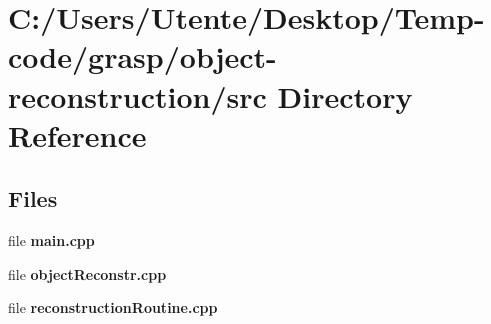 \section{C\+:/\+Users/\+Utente/\+Desktop/\+Temp-\/code/grasp/object-\/reconstruction/src Directory Reference}
\label{dir_d66a79fe53ea9cc766b7a9ad445c352f}
\subsection*{Files}
\begin{DoxyCompactItemize}
\item 
file {\bfseries main.\+cpp}
\item 
file {\bfseries object\+Reconstr.\+cpp}
\item 
file {\bfseries reconstruction\+Routine.\+cpp}
\end{DoxyCompactItemize}
